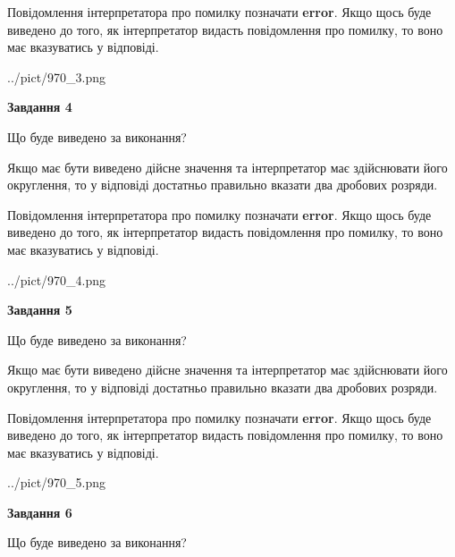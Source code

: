 \documentclass[12pt, ukrainian]{article}
\begin{document}
{\begin {Large}
Повідомлення інтерпретатора про помилку позначати \textbf{error}.
Якщо щось буде виведено до того, як інтерпретатор видасть повідомлення про помилку, 
то воно має вказуватись у відповіді. \par

\begin{center}
	{../pict/970_3.png}
\end{center}
\newpage

{\begin {center}\textbf{Завдання 4}\end {center}}\par
Що буде виведено за виконання? \par

Якщо має бути виведено дійсне значення та інтерпретатор має здійснювати його округлення, 
то у відповіді достатньо правильно вказати два дробових розряди.

Повідомлення інтерпретатора про помилку позначати \textbf{error}.
Якщо щось буде виведено до того, як інтерпретатор видасть повідомлення про помилку, 
то воно має вказуватись у відповіді. \par

\begin{center}
	{../pict/970_4.png}
\end{center}
\newpage

{\begin {center}\textbf{Завдання 5}\end {center}}\par
Що буде виведено за виконання? \par

Якщо має бути виведено дійсне значення та інтерпретатор має здійснювати його округлення, 
то у відповіді достатньо правильно вказати два дробових розряди.

Повідомлення інтерпретатора про помилку позначати \textbf{error}.
Якщо щось буде виведено до того, як інтерпретатор видасть повідомлення про помилку, 
то воно має вказуватись у відповіді. \par

\begin{center}
	{../pict/970_5.png}
\end{center}
\newpage

{\begin {center}\textbf{Завдання 6}\end {center}}\par
Що буде виведено за виконання? \par


\end{Large}}
\end{document}
